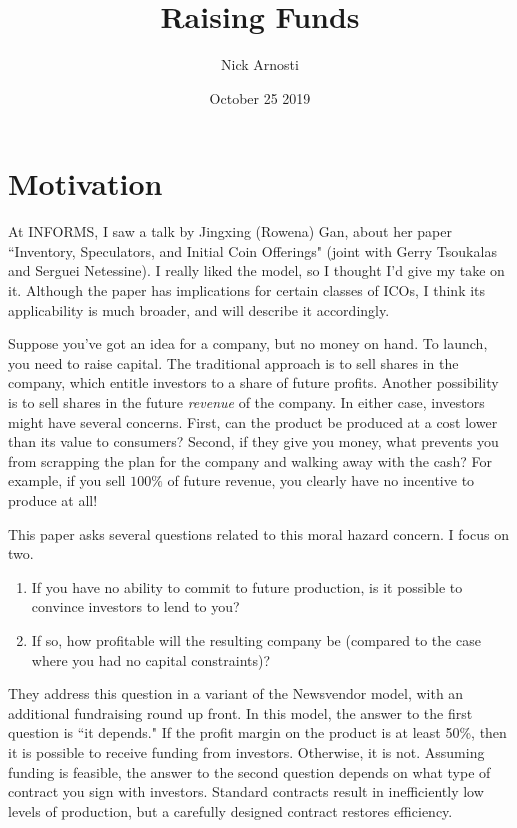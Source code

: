 \documentclass[11pt, oneside]{article}   	%
\title{\vspace{-.5 in} Raising Funds}
\author{Nick Arnosti}
\date{October 25 2019}							%
\begin{document}
\maketitle


\section{Motivation}

At INFORMS, I saw a talk by Jingxing (Rowena) Gan, about her paper ``Inventory, Speculators, and Initial Coin Offerings" (joint with Gerry Tsoukalas and Serguei Netessine). I really liked the model, so I thought I'd give my take on it. Although the paper has implications for certain classes of ICOs, I think its applicability is much broader, and will describe it accordingly. 

Suppose you've got an idea for a company, but no money on hand. To launch, you need to raise capital. The traditional approach is to sell shares in the company, which entitle investors to a share of future profits. Another possibility is to sell shares in the future {\em revenue} of the company. In either case, investors might have several concerns. First, can the product be produced at a cost lower than its value to consumers? Second, if they give you money, what prevents you from scrapping the plan for the company and walking away with the cash? For example, if you sell $100\%$ of future revenue, you clearly have no incentive to produce at all!  

This paper asks several questions related to this moral hazard concern. I focus on two.
\begin{enumerate}
\item If you have no ability to commit to future production, is it possible to convince investors to lend to you? 
\item If so, how profitable will the resulting company be (compared to the case where you had no capital constraints)?
\end{enumerate}
They address this question in a variant of the Newsvendor model,  with an additional fundraising round up front. In this model, the answer to the first question is ``it depends." If the profit margin on the product is at least 50\%, then it is possible to receive funding from investors. Otherwise, it is not. Assuming funding is feasible, the answer to the second question depends on what type of contract you sign with investors. Standard contracts result in inefficiently low levels of production, but a carefully designed contract restores efficiency.
\end{document}
